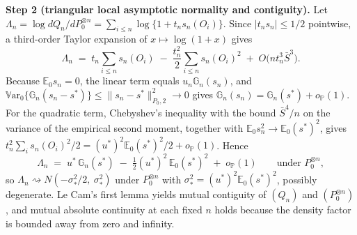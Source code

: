 \documentclass[11pt]{article}
\newcommand{\E}{\mathbb E}
\newcommand{\Pp}{\mathbb P}
\newcommand{\G}{\mathbb G}
\newcommand{\Var}{\mathbb V\mathrm{ar}}
\newcommand{\opro}{o_{\Pp}}
\newcommand{\dto}{\rightsquigarrow}
\newcommand{\norm}[1]{\lVert #1\rVert}
\begin{document}
\textbf{Step 2 (triangular local asymptotic normality and contiguity).} Let $\Lambda_n=\log dQ_n/dP_0^{\otimes n}=\sum_{i\le n}\log\{1+t_ns_n(O_i)\}$. Since $|t_ns_n|\le1/2$ pointwise, a third-order Taylor expansion of $x\mapsto\log(1+x)$ gives
\begin{equation*}
\Lambda_n\;=\;t_n\sum_{i\le n}s_n(O_i)\;-\;\frac{t_n^2}2\sum_{i\le n}s_n(O_i)^2\;+\;O\bigl(nt_n^3\bar S^3\bigr).
\end{equation*}
Because $\E_0s_n=0$, the linear term equals $u_n\G_n(s_n)$, and $\Var_0\{\G_n(s_n-s^\ast)\}\le\norm{s_n-s^\ast}_{P_0,2}^2\to0$ gives $\G_n(s_n)=\G_n(s^\ast)+\opro(1)$. For the quadratic term, Chebyshev's inequality with the bound $\bar S^4/n$ on the variance of the empirical second moment, together with $\E_0s_n^2\to\E_0(s^\ast)^2$, gives $t_n^2\sum_is_n(O_i)^2/2=(u^\ast)^2\E_0(s^\ast)^2/2+\opro(1)$. Hence
\begin{equation}\label{eq:lanhonest}
\Lambda_n\;=\;u^\ast\,\G_n(s^\ast)\;-\;\tfrac12(u^\ast)^2\,\E_0(s^\ast)^2\;+\;\opro(1)
\qquad\text{under }P_0^{\otimes n},
\end{equation}
so $\Lambda_n\dto N(-\sigma_\ast^2/2,\ \sigma_\ast^2)$ under $P_0^{\otimes n}$ with $\sigma_\ast^2=(u^\ast)^2\E_0(s^\ast)^2$, possibly degenerate. Le Cam's first lemma \citep[Example~6.5]{vandervaart1998} yields mutual contiguity of $(Q_n)$ and $(P_0^{\otimes n})$, and mutual absolute continuity at each fixed $n$ holds because the density factor is bounded away from zero and infinity.
\end{document}
